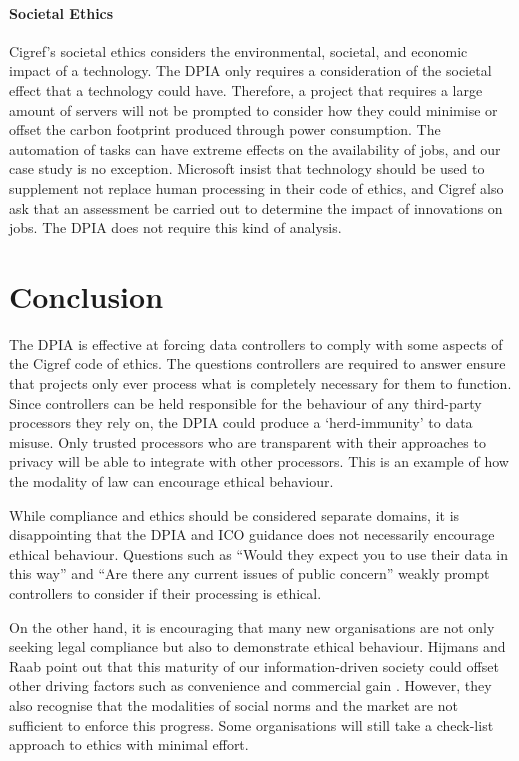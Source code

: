 \documentclass[12pt]{extarticle}
\begin{document}
\paragraph{Societal Ethics}

Cigref's societal ethics considers the environmental, societal, and economic impact of a technology. 
The DPIA only requires a consideration of the societal effect that a technology could have.
Therefore, a project that requires a large amount of servers will not be prompted to consider how they could minimise or offset the carbon footprint produced through power consumption.
The automation of tasks can have extreme effects on the availability of jobs, and our case study is no exception.
Microsoft insist that technology should be used to supplement not replace human processing in their code of ethics, and Cigref also ask that an assessment be carried out to determine the impact of innovations on jobs.
The DPIA does not require this kind of analysis.

\section{Conclusion}

The DPIA is effective at forcing data controllers to comply with some aspects of the Cigref code of ethics.
The questions controllers are required to answer ensure that projects only ever process what is completely necessary for them to function.
Since controllers can be held responsible for the behaviour of any third-party processors they rely on, the DPIA could produce a `herd-immunity' to data misuse.
Only trusted processors who are transparent with their approaches to privacy will be able to integrate with other processors.
This is an example of how the modality of law can encourage ethical behaviour.

While compliance and ethics should be considered separate domains, it is disappointing that the DPIA and ICO guidance does not necessarily encourage ethical behaviour.
Questions such as ``Would they expect you to use their data in this way'' and ``Are there any current issues of public concern'' weakly prompt controllers to consider if their processing is ethical.

On the other hand, it is encouraging that many new organisations are not only seeking legal compliance but also to demonstrate ethical behaviour.
Hijmans and Raab point out that this maturity of our information-driven society could offset other driving factors such as convenience and commercial gain \cite{raab}. 
However, they also recognise that the modalities of social norms and the market are not sufficient to enforce this progress. 
Some organisations will still take a check-list approach to ethics with minimal effort.
\end{document}
